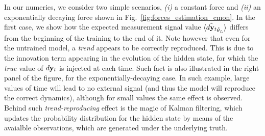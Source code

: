 In our numerics, we consider two simple scenarios, \textit{(i)} a constant force and \textit{(ii)} an exponentially decaying force shown in Fig.~\ref{fig:forces_estimation_cmon}. In the first case, we show how the expected measurement signal value $\mathinner{\langle \hat{d\mathbf{y}_t}_{\hat{\theta}_{L}}\rangle}$ differs from the beginning of the training to the end of it. Note however that even for the untrained model, a \textit{trend} appears to be correctly reproduced. This is due to the innovation term appearing in the evolution of the hidden state, for which the \textit{true} value of $d\mathbf{y}_t$ is injected at each time. Such fact is also illustrated in the right panel of the figure, for the exponentially-decaying case. In such example, large values of time will lead to no external signal (and thus the model will reproduce the correct dynamics), although for small values the same effect is observed. Behind such \textit{trend-reproducing} effect is the magic of Kalman filtering, which updates the probability distribution for the hidden state by means of the avaialble observations, which are generated under the underlying truth.

